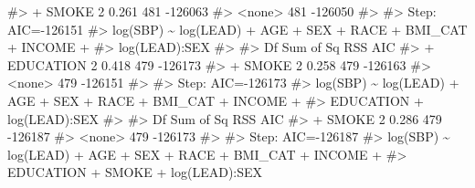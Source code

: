 \documentclass[
  letterpaper,
]{krantz}
\makeatletter
\newenvironment{Shaded}{\begin{snugshade}}{\end{snugshade}}
\newcommand{\CommentTok}[1]{\textcolor[rgb]{0.37,0.37,0.37}{#1}}
\newenvironment{kframe}{%
\medskip{}
\setlength{\fboxsep}{.8em}
 \def\at@end@of@kframe{}%
 \ifinner\ifhmode%
  \def\at@end@of@kframe{\end{minipage}}%
  \begin{minipage}{\columnwidth}%
 \fi\fi%
 \def\FrameCommand##1{\hskip\@totalleftmargin \hskip-\fboxsep
 \colorbox{shadecolor}{##1}\hskip-\fboxsep
     \hskip-\linewidth \hskip-\@totalleftmargin \hskip\columnwidth}%
 \MakeFramed {\advance\hsize-\width
   \@totalleftmargin\z@ \linewidth\hsize
   \@setminipage}}%
 {\par\unskip\endMakeFramed%
 \at@end@of@kframe}
\renewenvironment{Shaded}{\begin{kframe}}{\end{kframe}}
\makeatother
\begin{document}
\begin{Shaded}
\begin{Highlighting}[]
\CommentTok{\#\textgreater{} + SMOKE      2     0.261 481 {-}126063}
\CommentTok{\#\textgreater{} \textless{}none\textgreater{}                   481 {-}126050}
\CommentTok{\#\textgreater{} }
\CommentTok{\#\textgreater{} Step:  AIC={-}126151}
\CommentTok{\#\textgreater{} log(SBP) \textasciitilde{} log(LEAD) + AGE + SEX + RACE + BMI\_CAT + INCOME + }
\CommentTok{\#\textgreater{}     log(LEAD):SEX}
\CommentTok{\#\textgreater{} }
\CommentTok{\#\textgreater{}             Df Sum of Sq RSS     AIC}
\CommentTok{\#\textgreater{} + EDUCATION  2     0.418 479 {-}126173}
\CommentTok{\#\textgreater{} + SMOKE      2     0.258 479 {-}126163}
\CommentTok{\#\textgreater{} \textless{}none\textgreater{}                   479 {-}126151}
\CommentTok{\#\textgreater{} }
\CommentTok{\#\textgreater{} Step:  AIC={-}126173}
\CommentTok{\#\textgreater{} log(SBP) \textasciitilde{} log(LEAD) + AGE + SEX + RACE + BMI\_CAT + INCOME + }
\CommentTok{\#\textgreater{}     EDUCATION + log(LEAD):SEX}
\CommentTok{\#\textgreater{} }
\CommentTok{\#\textgreater{}         Df Sum of Sq RSS     AIC}
\CommentTok{\#\textgreater{} + SMOKE  2     0.286 479 {-}126187}
\CommentTok{\#\textgreater{} \textless{}none\textgreater{}               479 {-}126173}
\CommentTok{\#\textgreater{} }
\CommentTok{\#\textgreater{} Step:  AIC={-}126187}
\CommentTok{\#\textgreater{} log(SBP) \textasciitilde{} log(LEAD) + AGE + SEX + RACE + BMI\_CAT + INCOME + }
\CommentTok{\#\textgreater{}     EDUCATION + SMOKE + log(LEAD):SEX}
\end{Highlighting}
\end{Shaded}
\end{document}
